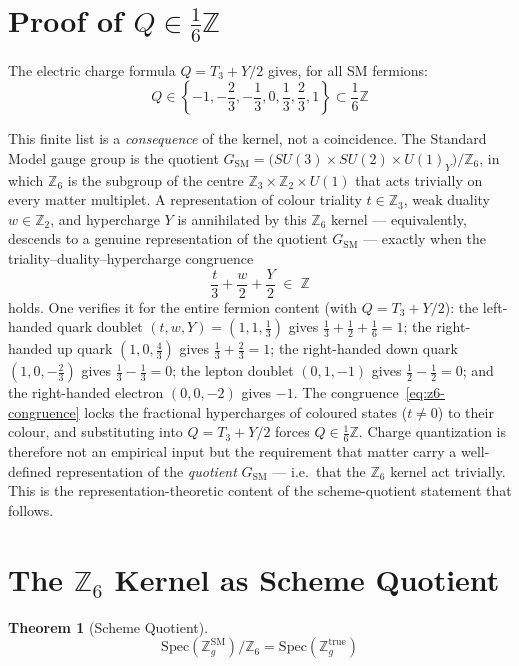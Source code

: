 \documentclass[11pt,a4paper,openright]{book}
\theoremstyle{plain}
\newtheorem{theorem}{Theorem}[chapter]
\theoremstyle{definition}
\newcommand{\SM}{\mathrm{SM}}
\newcommand{\Spec}{\mathrm{Spec}}
\newcommand{\Z}{\mathbb{Z}}
\begin{document}
\section{Proof of $Q \in \frac{1}{6}\Z$}

The electric charge formula $Q = T_3 + Y/2$ gives, for all SM fermions:
\begin{equation}
Q \in \left\{-1, -\frac{2}{3}, -\frac{1}{3}, 0, \frac{1}{3}, \frac{2}{3}, 1\right\} \subset \frac{1}{6}\Z
\end{equation}

This finite list is a \emph{consequence} of the kernel, not a coincidence. The Standard Model gauge group is the
quotient $G_{\SM}=\big(SU(3)\times SU(2)\times U(1)_Y\big)/\Z_6$, in which $\Z_6$ is the subgroup of the centre
$\Z_3\times\Z_2\times U(1)$ that acts trivially on every matter multiplet. A representation of colour triality
$t\in\Z_3$, weak duality $w\in\Z_2$, and hypercharge $Y$ is annihilated by this $\Z_6$ kernel --- equivalently,
descends to a genuine representation of the quotient $G_{\SM}$ --- exactly when the triality--duality--hypercharge
congruence
\begin{equation}\label{eq:z6-congruence}
\frac{t}{3}+\frac{w}{2}+\frac{Y}{2}\;\in\;\Z
\end{equation}
holds. One verifies it for the entire fermion content (with $Q=T_3+Y/2$): the left-handed quark doublet
$(t,w,Y)=(1,1,\tfrac13)$ gives $\tfrac13+\tfrac12+\tfrac16=1$; the right-handed up quark $(1,0,\tfrac43)$ gives
$\tfrac13+\tfrac23=1$; the right-handed down quark $(1,0,-\tfrac23)$ gives $\tfrac13-\tfrac13=0$; the lepton
doublet $(0,1,-1)$ gives $\tfrac12-\tfrac12=0$; and the right-handed electron $(0,0,-2)$ gives $-1$. The
congruence~\eqref{eq:z6-congruence} locks the fractional hypercharges of coloured states ($t\neq0$) to their
colour, and substituting into $Q=T_3+Y/2$ forces $Q\in\frac16\Z$. Charge quantization is therefore not an
empirical input but the requirement that matter carry a well-defined representation of the \emph{quotient}
$G_{\SM}$ --- i.e.\ that the $\Z_6$ kernel act trivially. This is the representation-theoretic content of the
scheme-quotient statement that follows.

\section{The $\Z_6$ Kernel as Scheme Quotient}

\begin{theorem}[Scheme Quotient]
\begin{equation}
\Spec(\Z_g^{\SM})/\Z_6 = \Spec(\Z_g^{\mathrm{true}})
\end{equation}
\end{theorem}
\end{document}
